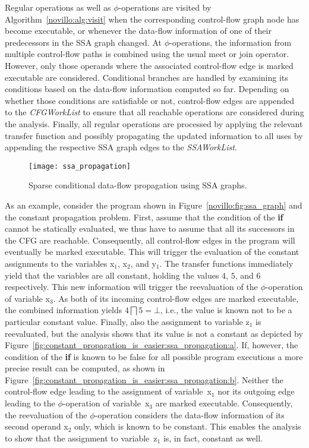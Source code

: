 Regular operations as well as $\phi$-operations are visited by
Algorithm~\ref{novillo:alg:visit} when the corresponding control-flow graph node
has become executable, or whenever the data-flow information of one of their
predecessors in the SSA graph changed. At \linebreak $\phi$-operations, the
information
from multiple control-flow paths is combined using the usual meet or join
operator. However, only those operands where the associated control-flow edge is
marked executable are considered. Conditional
branches are handled by examining its conditions based on the data-flow
information computed so far. Depending on whether those conditions are
satisfiable or not, control-flow edges are appended to the \emph{CFGWorkList} 
to ensure that all reachable operations are considered during the analysis.
Finally, all regular operations are processed by applying the relevant transfer
function and possibly propagating the updated information to all uses by
appending the respective SSA graph edges to the \emph{SSAWorkList}.

\begin{figure}[t]
  \texttt{[image: ssa\_propagation]}
  \subfloat{\label{fig:constant_propagation_is_easier:ssa_propagation:a}}
  \subfloat{\label{fig:constant_propagation_is_easier:ssa_propagation:b}}
  \caption{Sparse conditional data-flow propagation using SSA graphs.}
  \label{fig:constant_propagation_is_easier:ssa_propagation}
\end{figure}

As an example, consider the program shown in Figure~\ref{novillo:fig:ssa_graph}
and the constant propagation problem. First,
assume that the condition of the \textbf{if} cannot be statically evaluated, we
thus have to assume that all its successors in the CFG are reachable.
Consequently, all control-flow edges in the program will eventually be marked
executable. This will trigger the evaluation of the constant assignments to
the variables x$_1$,  x$_2$, and y$_1$. The transfer functions immediately yield
that the variables are all constant, holding the values $4$, $5$, and $6$
respectively. This new information will trigger the reevaluation of the
$\phi$-operation of variable x$_3$. As both of its incoming control-flow edges
are marked executable, the combined information yields $4 \bigsqcap 5 = \bot$,
i.e., the value is known not to be a particular constant value. Finally, also
the assignment
to variable z$_1$ is reevaluated, but the analysis shows that its value is not a
constant as depicted by Figure~\ref{fig:constant_propagation_is_easier:ssa_propagation:a}. If, however,
the condition of the \textbf{if} is known to be false for all possible program
executions a more precise result can be computed, as shown in
Figure~\ref{fig:constant_propagation_is_easier:ssa_propagation:b}.
Neither the control-flow edge leading to the
assignment of variable~x$_1$ nor its outgoing edge leading
to the $\phi$-operation of variable~x$_3$ are marked executable.
Consequently, the reevaluation of
the $\phi$-operation considers the data-flow information of its second operand
x$_2$ only, which is known to be constant. This enables the analysis
to show that the assignment to variable~z$_1$ is, in fact, constant as well.

